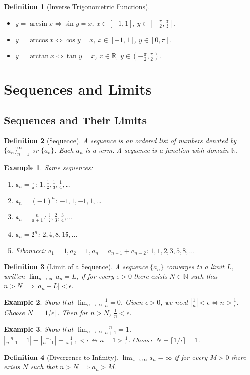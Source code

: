 \documentclass[11pt,a4paper]{article}
\newtheorem{example}{Example}
\newtheorem{definition}{Definition}
\begin{document}
\begin{definition}[Inverse Trigonometric Functions]
\begin{itemize}
\item $y = \arcsin x \iff \sin y = x$, $x \in [-1,1]$, $y \in [-\frac{\pi}{2}, \frac{\pi}{2}]$.
\item $y = \arccos x \iff \cos y = x$, $x \in [-1,1]$, $y \in [0, \pi]$.
\item $y = \arctan x \iff \tan y = x$, $x \in \mathbb{R}$, $y \in (-\frac{\pi}{2}, \frac{\pi}{2})$.
\end{itemize}
\end{definition}
\section{Sequences and Limits}
\subsection{Sequences and Their Limits}
\begin{definition}[Sequence]
A \textit{sequence} is an ordered list of numbers denoted by $\{a_n\}_{n=1}^{\infty}$ or $\{a_n\}$. Each $a_n$ is a \textit{term}. A sequence is a function with domain $\mathbb{N}$.
\end{definition}
\begin{example}
Some sequences:
\begin{enumerate}
\item $a_n = \frac{1}{n}$: $1, \frac{1}{2}, \frac{1}{3}, \frac{1}{4}, \dots$
\item $a_n = (-1)^n$: $-1, 1, -1, 1, \dots$
\item $a_n = \frac{n}{n+1}$: $\frac{1}{2}, \frac{2}{3}, \frac{3}{4}, \dots$
\item $a_n = 2^n$: $2, 4, 8, 16, \dots$
\item Fibonacci: $a_1 = 1, a_2 = 1, a_n = a_{n-1} + a_{n-2}$: $1, 1, 2, 3, 5, 8, \dots$
\end{enumerate}
\end{example}
\begin{definition}[Limit of a Sequence]
A sequence $\{a_n\}$ \textit{converges} to a limit $L$, written $\lim_{n \to \infty} a_n = L$, if for every $\epsilon > 0$ there exists $N \in \mathbb{N}$ such that $n > N \implies |a_n - L| < \epsilon$.
\end{definition}
\begin{example}
Show that $\lim_{n \to \infty} \frac{1}{n} = 0$.
Given $\epsilon > 0$, we need $\left|\frac{1}{n}\right| < \epsilon \iff n > \frac{1}{\epsilon}$. Choose $N = \lceil 1/\epsilon \rceil$. Then for $n > N$, $\frac{1}{n} < \epsilon$.
\end{example}
\begin{example}
Show that $\lim_{n \to \infty} \frac{n}{n+1} = 1$.
$\left|\frac{n}{n+1} - 1\right| = \left|\frac{-1}{n+1}\right| = \frac{1}{n+1} < \epsilon \iff n+1 > \frac{1}{\epsilon}$. Choose $N = \lceil 1/\epsilon \rceil - 1$.
\end{example}
\begin{definition}[Divergence to Infinity]
$\lim_{n \to \infty} a_n = \infty$ if for every $M > 0$ there exists $N$ such that $n > N \implies a_n > M$.
\end{definition}
\end{document}
